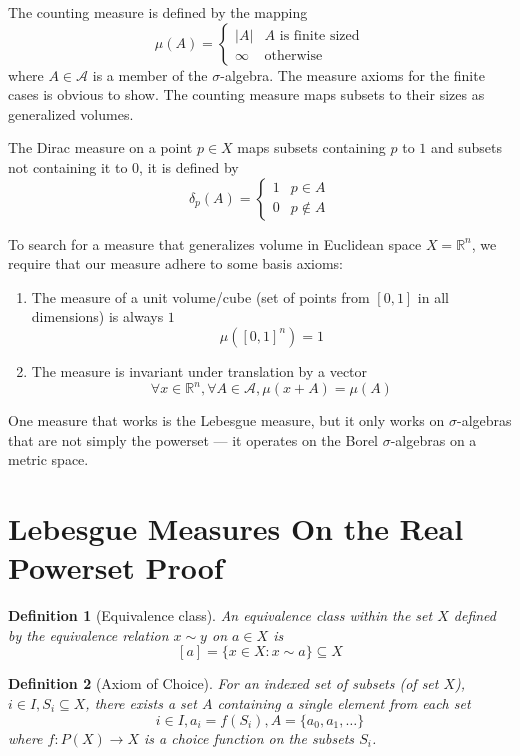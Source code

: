 \documentclass{article}
\newtheorem{defi}{Definition}[section]
\begin{document}
The counting measure is defined by the mapping
\[
    \mu(A) = \begin{cases}
        |A| & \text{$A$ is finite sized}\\
        \infty & \text{otherwise}
    \end{cases}
\]
where $A \in \mathcal A$ is a member of the $\sigma$-algebra. The measure axioms for the finite cases is obvious to show. The counting measure maps subsets to their sizes as generalized volumes.

The Dirac measure on a point $p \in X$ maps subsets containing $p$ to $1$ and subsets not containing it to $0$, it is defined by
\[
    \delta_p(A) = \begin{cases}
        1 & p \in A\\
        0 & p \notin A
    \end{cases}
\]

To search for a measure that generalizes volume in Euclidean space $X = \mathbb{R}^n$, we require that our measure adhere to some basis axioms:
\begin{enumerate}
    \item The measure of a unit volume/cube (set of points from $[0,1]$ in all dimensions) is always $1$
    \[
        \mu([0,1]^n) = 1
    \]
    \item The measure is invariant under translation by a vector
    \[
        \forall x \in \mathbb{R}^n, \forall A \in \mathcal A, \mu(x + A) = \mu(A)
    \]
\end{enumerate}
One measure that works is the Lebesgue measure, but it only works on $\sigma$-algebras that are not simply the powerset --- it operates on the Borel $\sigma$-algebras on a metric space.

\newpage
\section{Lebesgue Measures On the Real Powerset Proof}

\begin{defi}[Equivalence class]
    An equivalence class within the set $X$ defined by the equivalence relation $x \sim y$ on $a \in X$ is
    \[
        [a] = \{x \in X \colon x \sim a\} \subseteq X
    \]
\end{defi}

\begin{defi}[Axiom of Choice]
    For an indexed set of subsets (of set $X$), $i \in I, S_i \subseteq X$, there exists a set $A$ containing a single element from each set
    \[
        i \in I, a_i = f(S_i), A = \{a_0, a_1, \dots\}
    \]
    where $f \colon P(X) \to X$ is a choice function on the subsets $S_i$.
\end{defi}
\end{document}
